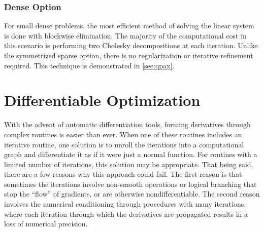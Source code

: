 \subsubsection{Dense Option}
For small dense problems, the most efficient method of solving the linear system is done with blockwise elimination. The majority of the computational cost in this scenario is performing two Cholesky decompositions at each iteration. Unlike the symmetrized sparse option, there is no regularization or iterative refinement required. This technique is demonstrated in \ref{sec:qpax}.
%
%
\section{Differentiable Optimization}
%
%
With the advent of automatic differentiation tools, forming derivatives through complex routines is easier than ever. When one of these routines includes an iterative routine, one solution is to unroll the iterations into a computational graph and differentiate it as if it were just a normal function. For routines with a limited number of iterations, this solution may be appropriate. That being said, there are a few reasons why this approach could fail. The first reason is that sometimes the iterations involve non-smooth operations or logical branching that stop the ``flow'' of gradients, or are otherwise nondifferentiable. The second reason involves the numerical conditioning through procedures with many iterations, where each iteration through which the derivatives are propagated results in a loss of numerical precision.
%
%
